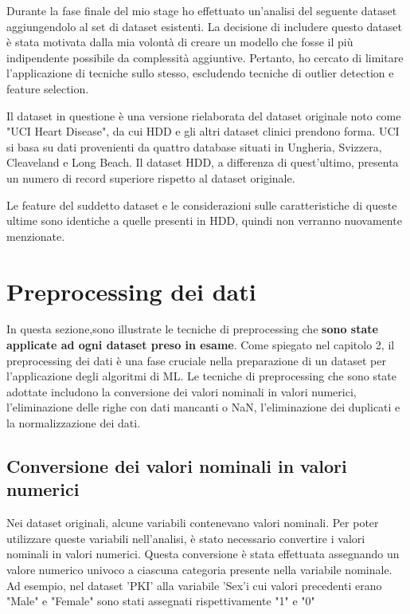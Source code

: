 \begin{flushleft}
Durante la fase finale del mio stage ho effettuato un'analisi del seguente dataset aggiungendolo al set di dataset esistenti. La decisione di includere questo dataset è stata motivata dalla mia volontà di creare un modello che fosse il più indipendente possibile da complessità aggiuntive. Pertanto, ho cercato di limitare l'applicazione di tecniche sullo stesso, escludendo tecniche di outlier detection e feature selection.

Il dataset in questione è una versione rielaborata del dataset originale noto come "UCI Heart Disease", da cui HDD e gli altri dataset clinici prendono forma. UCI si basa su dati provenienti da quattro database situati in Ungheria, Svizzera, Cleaveland e Long Beach.
Il dataset HDD, a differenza di quest'ultimo, presenta un numero di record superiore rispetto al dataset originale.

Le feature del suddetto dataset e le considerazioni sulle caratteristiche di queste ultime sono identiche a quelle presenti in HDD, quindi non verranno nuovamente menzionate.



\section{Preprocessing dei dati}

In questa sezione,sono illustrate le tecniche di preprocessing che \textbf{sono state applicate ad ogni dataset preso in esame}.
Come spiegato nel capitolo 2, il preprocessing dei dati è una fase cruciale nella preparazione di un dataset per l'applicazione degli algoritmi di ML.
Le tecniche di preprocessing che sono state adottate includono la conversione dei valori nominali in valori numerici, l'eliminazione delle righe con dati mancanti o NaN, l'eliminazione dei duplicati e la normalizzazione dei dati.

\subsection{Conversione dei valori nominali in valori numerici} 
Nei dataset originali, alcune variabili contenevano valori nominali. Per poter utilizzare queste variabili nell'analisi, è stato necessario convertire i valori nominali in valori numerici. Questa conversione è stata effettuata assegnando un valore numerico univoco a ciascuna categoria presente nella variabile nominale. Ad esempio, nel dataset 'PKI' alla variabile 'Sex'i cui valori precedenti erano "Male" e "Female" sono stati assegnati rispettivamente "1" e "0"


\end{flushleft}
